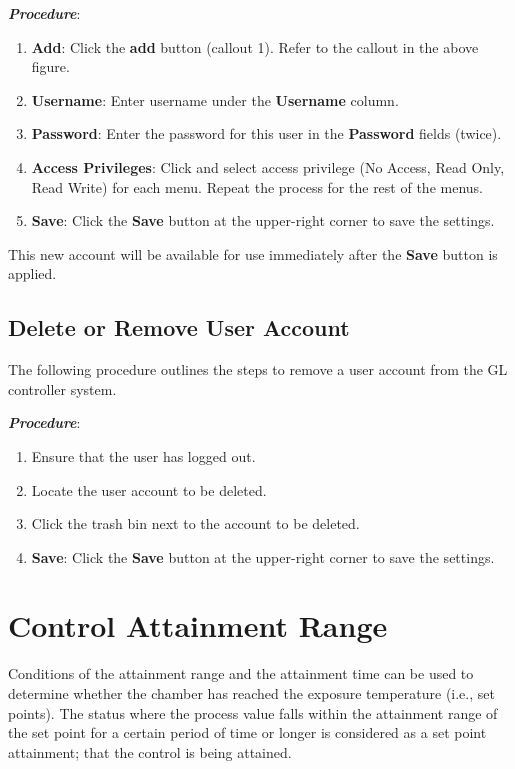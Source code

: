 \textbf{\emph{Procedure}}:

\begin{enumerate}
\def\labelenumi{\arabic{enumi}.}
\tightlist
\item
  \textbf{Add}: Click the \textbf{add} button (callout 1). Refer to the
  callout in the above figure.\\
\item
  \textbf{Username}: Enter username under the \textbf{Username}
  column.\\
\item
  \textbf{Password}: Enter the password for this user in the
  \textbf{Password} fields (twice).
\item
  \textbf{Access Privileges}: Click and select access privilege (No
  Access, Read Only, Read Write) for each menu. Repeat the process for
  the rest of the menus.
\item
  \textbf{Save}: Click the \textbf{Save} button at the upper-right
  corner to save the settings.
\end{enumerate}

This new account will be available for use immediately after the
\textbf{Save} button is applied.


\subsection{Delete or Remove User
Account}

The following procedure outlines the steps to remove a user account from
the GL controller system.

\textbf{\emph{Procedure}}:

\begin{enumerate}
\def\labelenumi{\arabic{enumi}.}
\tightlist
\item
  Ensure that the user has logged out.
\item
  Locate the user account to be deleted.
\item
  Click the trash bin next to the account to be deleted.
\item
  \textbf{Save}: Click the \textbf{Save} button at the upper-right
  corner to save the settings.
\end{enumerate}


\section{Control Attainment
Range}

Conditions of the attainment range and the attainment time can be used
to determine whether the chamber has reached the exposure temperature
(i.e., set points). The status where the process value falls within the
attainment range of the set point for a certain period of time or longer
is considered as a set point attainment; that the control is being
attained.

